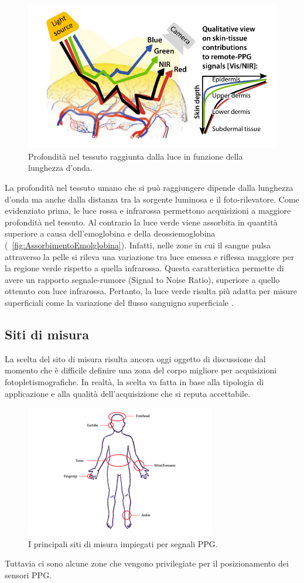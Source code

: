\begin{figure}[h]
	\centering
	\includegraphics[width=0.6\linewidth]{ImageFiles/Fotopletismografia/PenetrazioneLuce}
	\caption{Profondità nel tessuto raggiunta dalla luce in funzione della lunghezza d'onda.}
	\label{fig:PenetrazioneLuce}
\end{figure}
La profondità nel tessuto umano che si può raggiungere dipende dalla lunghezza d'onda ma anche dalla distanza tra la sorgente luminosa e il foto-rilevatore. Come evidenziato prima, le luce rossa e infrarossa permettono acquisizioni a maggiore profondità nel tessuto. Al contrario la luce verde viene assorbita in quantità superiore\cite{Lee2021}  a causa dell'emoglobina e della deossiemoglobina (\Fig~\ref{fig:AssorbimentoEmolglobina}). Infatti, nelle zone in cui il sangue pulsa attraverso la pelle si rileva una variazione tra luce emessa e riflessa maggiore per la regione verde rispetto a quella infrarossa. Questa caratteristica permette di avere un rapporto segnale-rumore (Signal to Noise Ratio), superiore a quello ottenuto con luce infrarossa. Pertanto, la luce verde risulta più adatta per misure superficiali come la variazione del flusso sanguigno superficiale \cite{Youssef2020}.

\subsection{Siti di misura}
La scelta del sito di misura risulta ancora oggi oggetto di discussione dal momento che è difficile definire una zona del corpo migliore per acquisizioni fotopletismografiche. In realtà, la scelta va fatta in base alla tipologia di applicazione e alla qualità dell'acquisizione che si reputa accettabile.
\begin{figure}[h]
	\centering
	\includegraphics[width=0.6\linewidth]{ImageFiles/Fotopletismografia/ZoneAcquisizione}
	\caption{I principali siti di misura impiegati per segnali PPG.}
	\label{fig:ZoneAcquisizione}
\end{figure}
Tuttavia ci sono alcune zone che vengono privilegiate per il posizionamento dei sensori PPG.


